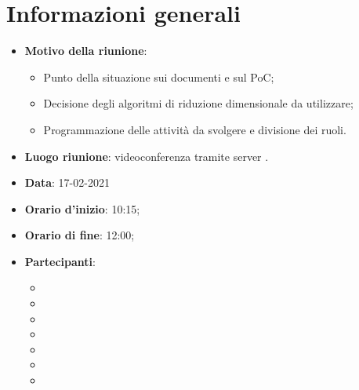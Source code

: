 \section{Informazioni generali}
\begin{itemize}
\item \textbf{Motivo della riunione}: 
\begin{itemize}
\item Punto della situazione sui documenti e sul PoC;
\item Decisione degli algoritmi di riduzione dimensionale da utilizzare;
\item Programmazione delle attività da svolgere e divisione dei ruoli.
\end{itemize}
\item \textbf{Luogo riunione}: videoconferenza tramite server .
\item \textbf{Data}: 17-02-2021
\item \textbf{Orario d'inizio}: 10:15;
\item \textbf{Orario di fine}: 12:00;
\item \textbf{Partecipanti}:
	\begin{itemize}
	\item \BM{}
	\item \SG{}
	\item \SP{}
	\item \SH{}
	\item \PA{}
	\item \ZM{}
	\item \RA{}
	\end{itemize}
\end{itemize}

\newpage
